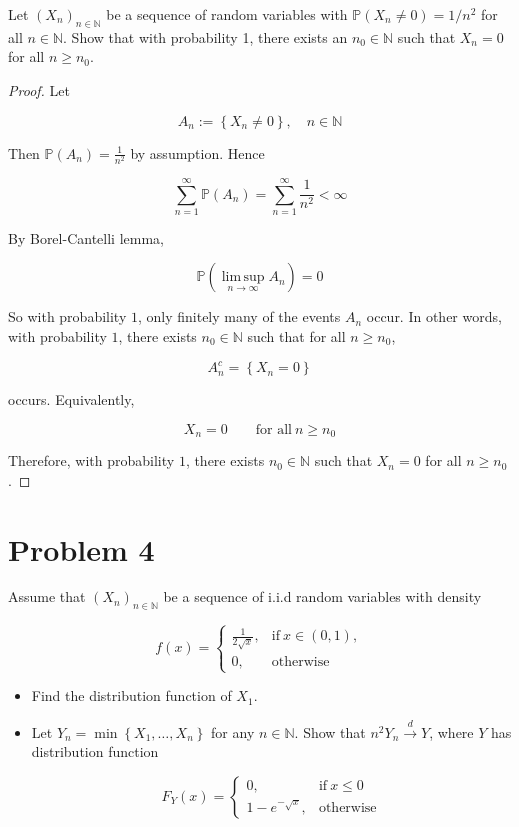 \documentclass{qlnotes-export}
\begin{document}
Let \(\left( X_{n} \right)_{n \in {\mathbb{N}}}\) be a sequence of random variables with \({\mathbb{P}}\left( {X_{n} \neq 0} \right) = 1/n^{2}\) for all \(n \in {\mathbb{N}}\). Show that with probability 1, there exists an \(n_{0} \in {\mathbb{N}}\) such that \(X_{n} = 0\) for all \(n \geq n_{0}\).

\begin{proof}

Let

\[A_{n} := \left\{ {X_{n} \neq 0} \right\},\quad n \in {\mathbb{N}}\]

Then \({\mathbb{P}}(A_{n}) = \frac{1}{n^{2}}\) by assumption. Hence

\[\sum\limits_{n = 1}^{\infty}{\mathbb{P}}(A_{n}) = \sum\limits_{n = 1}^{\infty}\frac{1}{n^{2}} < \infty\]

By Borel-Cantelli lemma,

\[{\mathbb{P}}\left( {\operatorname{lim\, sup}\limits_{n\rightarrow\infty}A_{n}} \right) = 0\]

So with probability \(1\), only finitely many of the events \(A_{n}\) occur. In other words, with probability \(1\), there exists \(n_{0} \in {\mathbb{N}}\) such that for all \(n \geq n_{0}\),

\[A_{n}^{c} = \left\{ {X_{n} = 0} \right\}\]

occurs. Equivalently,

\[X_{n} = 0\qquad\text{for all}\ n \geq n_{0}\]

Therefore, with probability \(1\), there exists \(n_{0} \in {\mathbb{N}}\) such that \(X_{n} = 0\) for all \(n \geq n_{0}\).

\end{proof}

\section{Problem 4}\label{problem-4-5}

Assume that \(\left( X_{n} \right)_{n \in {\mathbb{N}}}\) be a sequence of i.i.d random variables with density

\[f(x) = \left\{ \begin{matrix}
{\frac{1}{2\sqrt{x}},} & {\text{if}\ x \in (0,1),} \\
{0,} & \text{otherwise}
\end{matrix} \right.\]

\begin{itemize}
\item
  Find the distribution function of \(X_{1}\).
\item
  Let \(Y_{n} = \min\left\{ {X_{1},\ldots,X_{n}} \right\}\) for any \(n \in {\mathbb{N}}\). Show that \(n^{2}Y_{n}\overset{d}{\rightarrow}Y\), where \(Y\) has distribution function

  \[F_{Y}(x) = \left\{ \begin{matrix}
  {0,} & {\text{if}\ x \leq 0} \\
  {1 - e^{- \sqrt{x}},} & \text{otherwise}
  \end{matrix} \right.\]
\end{itemize}
\end{document}
